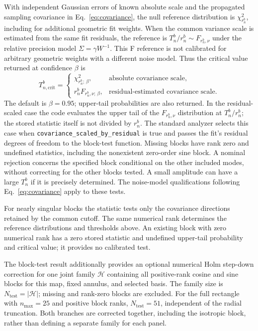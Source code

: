 \documentclass[aps,prb,preprint,onecolumn,notitlepage,amsmath,amssymb,
  superscriptaddress,floatfix]{revtex4-2}
\begin{document}
With independent Gaussian errors of known absolute scale and the propagated
sampling covariance in Eq.~\eqref{eq:covariance}, the null reference
distribution is $\chi^2_{r_n^b}$, including for additional geometric fit
weights. When the common variance scale is estimated from the same fit
residuals, the reference is $T_n^b/r_n^b\sim F_{r_n^b,\nu}$ under the
relative precision model $\Sigma=\gamma W^{-1}$. This F reference is not
calibrated for arbitrary geometric weights with a different noise model.
Thus the critical value returned at confidence $\beta$ is
\begin{equation}
 T_{n,\mathrm{crit}}^b=
 \begin{cases}
 \chi^2_{r_n^b;\,\beta},&\text{absolute covariance scale},\\
 r_n^b F_{r_n^b,\nu;\,\beta},&\text{residual-estimated covariance scale}.
 \end{cases}
 \label{eq:block-threshold}
\end{equation}
The default is $\beta=0.95$; upper-tail probabilities are also returned.
In the residual-scaled case the code evaluates the upper tail of the
$F_{r_n^b,\nu}$ distribution at $T_n^b/r_n^b$; the stored statistic itself
is not divided by $r_n^b$. The standard analyzer selects this case when
\texttt{covariance\_scaled\_by\_residual} is true and passes the fit's
residual degrees of freedom to the block-test function.
Missing blocks have rank zero and undefined statistics, including the
nonexistent zero-order sine block. A nominal rejection concerns the specified
block conditional on the other included modes, without correcting for the
other blocks tested. A small amplitude can have a large $T_n^b$ if it is
precisely determined. The noise-model qualifications following
Eq.~\eqref{eq:covariance} apply to these tests.

For nearly singular blocks the statistic tests only the covariance
directions retained by the common cutoff. The same numerical rank
determines the reference distributions and thresholds above. An existing
block with zero numerical rank has a zero stored statistic and undefined
upper-tail probability and critical value; it provides no calibrated test.

The block-test result additionally provides an optional numerical Holm
step-down correction for one joint family $\mathcal H$ containing all positive-rank cosine and sine
blocks for this map, fixed annulus, and selected basis. The family size is
$N_{\mathrm{test}}=|\mathcal H|$; missing and rank-zero blocks are excluded.
For the full rectangle with $n_{\max}=25$ and positive block ranks,
$N_{\mathrm{test}}=51$, independent of the radial truncation. Both branches
are corrected together, including the isotropic block, rather than defining
a separate family for each panel.
\end{document}
